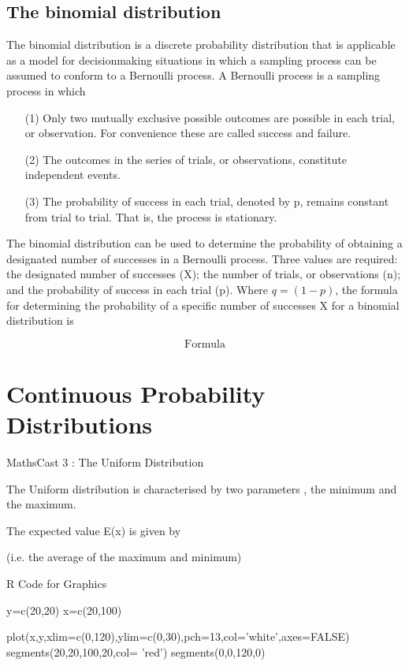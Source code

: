 \documentclass[12pt]{report}
\begin{document}
\section{The binomial distribution }

The binomial distribution  is a discrete probability distribution that is applicable as a model for decisionmaking
situations in which a sampling process can be assumed to conform to a Bernoulli process. A Bernoulli
process is a sampling process in which
\begin{itemize}
\item[(1)] Only two mutually exclusive possible outcomes are possible in each trial, or observation. For
convenience these are called success and failure.
\item[(2)] The outcomes in the series of trials, or observations, constitute independent events.
\item[(3)] The probability of success in each trial, denoted by p, remains constant from trial to trial. That is,
the process is stationary.
\end{itemize}

The binomial distribution can be used to determine the probability of obtaining a designated number of
successes in a Bernoulli process. Three values are required: the designated number of successes (X); the number
of trials, or observations (n); and the probability of success in each trial (p). Where $q = (1 - p)$, the formula for
determining the probability of a specific number of successes X for a binomial distribution is

\[ \mbox{Formula} \]


\chapter{Continuous Probability Distributions}
MathsCast 3 : The Uniform Distribution



The Uniform distribution is characterised by two parameters , the minimum and the maximum.

The expected value E(x) is given by



(i.e. the average of the maximum and minimum)





R Code for Graphics

y=c(20,20)
x=c(20,100)

plot(x,y,xlim=c(0,120),ylim=c(0,30),pch=13,col='white',axes=FALSE)
segments(20,20,100,20,col= 'red')
segments(0,0,120,0)
\end{document}
